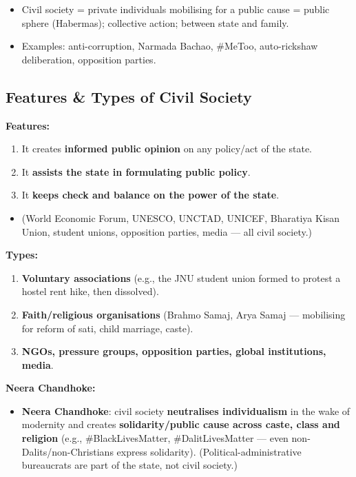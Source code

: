 \begin{QuickRevision}
\begin{itemize}
\item Civil society = private individuals mobilising for a public cause = public sphere (Habermas); collective action; between state and family.
\item Examples: anti-corruption, Narmada Bachao, \#MeToo, auto-rickshaw deliberation, opposition parties.
\end{itemize}
\end{QuickRevision}

\sectiondivider

\subsection{Features \& Types of Civil Society}

\begin{DataFact}
\textbf{Features:}
\begin{enumerate}
\item It creates \textbf{informed public opinion} on any policy/act of the state.
\item It \textbf{assists the state in formulating public policy}.
\item It \textbf{keeps check and balance on the power of the state}.
\end{enumerate}
\begin{itemize}
\item (World Economic Forum, UNESCO, UNCTAD, UNICEF, Bharatiya Kisan Union, student unions, opposition parties, media --- all civil society.)
\end{itemize}
\end{DataFact}

\begin{DataFact}
\textbf{Types:}
\begin{enumerate}
\item \textbf{Voluntary associations} (e.g., the JNU student union formed to protest a hostel rent hike, then dissolved).
\item \textbf{Faith/religious organisations} (Brahmo Samaj, Arya Samaj --- mobilising for reform of sati, child marriage, caste).
\item \textbf{NGOs, pressure groups, opposition parties, global institutions, media}.
\end{enumerate}
\end{DataFact}

\begin{KeyConcept}
\textbf{Neera Chandhoke:}
\begin{itemize}
\item \textbf{Neera Chandhoke}: civil society \textbf{neutralises individualism} in the wake of modernity and creates \textbf{solidarity/public cause across caste, class and religion} (e.g., \#BlackLivesMatter, \#DalitLivesMatter --- even non-Dalits/non-Christians express solidarity). (Political-administrative bureaucrats are part of the state, not civil society.)
\end{itemize}
\end{KeyConcept}

